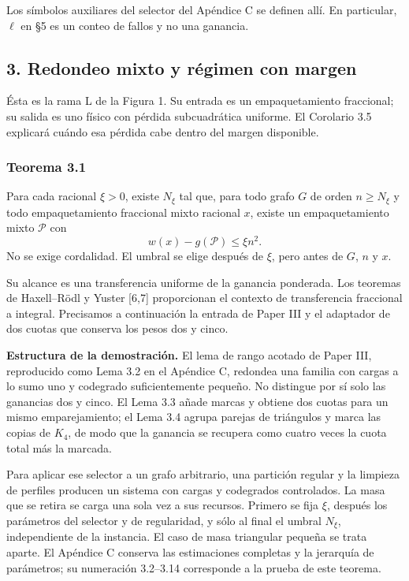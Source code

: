 \documentclass[spanish,11pt,a4paper]{article}
\begin{document}
Los símbolos auxiliares del selector del Apéndice C se definen allí. En particular, \(\ell\) en §5 es un conteo de fallos y no una ganancia.

\subsection{3. Redondeo mixto y régimen con margen}\label{redondeo-mixto-y-regimen-con-margen}

Ésta es la rama L de la Figura 1. Su entrada es un empaquetamiento fraccional; su salida es uno físico con pérdida subcuadrática uniforme. El Corolario 3.5 explicará cuándo esa pérdida cabe dentro del margen disponible.

\subsubsection{Teorema 3.1}\label{teorema-3.1}

Para cada racional \(\xi>0\), existe \(N_\xi\) tal que, para todo grafo \(G\) de orden \(n\ge N_\xi\) y todo empaquetamiento fraccional mixto racional \(x\), existe un empaquetamiento mixto \(\mathcal P\) con \[
w(x)-g(\mathcal P)\le\xi n^2.
\tag{3.1}
\] No se exige cordalidad. El umbral se elige después de \(\xi\), pero antes de \(G\), \(n\) y \(x\).

Su alcance es una transferencia uniforme de la ganancia ponderada. Los teoremas de Haxell--Rödl y Yuster {[}6,7{]} proporcionan el contexto de transferencia fraccional a integral. Precisamos a continuación la entrada de Paper III y el adaptador de dos cuotas que conserva los pesos dos y cinco.

\textbf{Estructura de la demostración.} El lema de rango acotado de Paper III, reproducido como Lema 3.2 en el Apéndice C, redondea una familia con cargas a lo sumo uno y codegrado suficientemente pequeño. No distingue por sí solo las ganancias dos y cinco. El Lema 3.3 añade marcas y obtiene dos cuotas para un mismo emparejamiento; el Lema 3.4 agrupa parejas de triángulos y marca las copias de \(K_4\), de modo que la ganancia se recupera como cuatro veces la cuota total más la marcada.

Para aplicar ese selector a un grafo arbitrario, una partición regular y la limpieza de perfiles producen un sistema con cargas y codegrados controlados. La masa que se retira se carga una sola vez a sus recursos. Primero se fija \(\xi\), después los parámetros del selector y de regularidad, y sólo al final el umbral \(N_\xi\), independiente de la instancia. El caso de masa triangular pequeña se trata aparte. El Apéndice C conserva las estimaciones completas y la jerarquía de parámetros; su numeración 3.2--3.14 corresponde a la prueba de este teorema.
\end{document}
